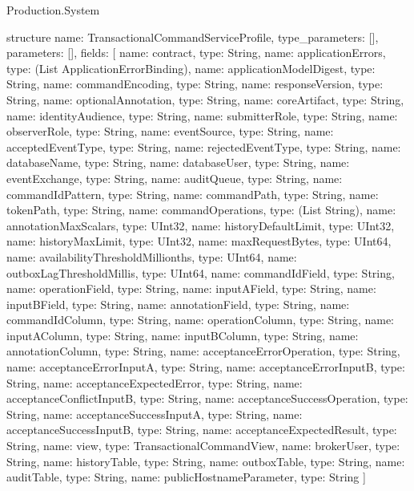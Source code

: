\begin{lexlean}{Production.System}
\begin{semanticmodule}
structure{
  name: TransactionalCommandServiceProfile,
  type_parameters: [],
  parameters: [],
  fields: [
    {name: contract, type: String},
    {name: applicationErrors, type: (List ApplicationErrorBinding)},
    {name: applicationModelDigest, type: String},
    {name: commandEncoding, type: String},
    {name: responseVersion, type: String},
    {name: optionalAnnotation, type: String},
    {name: coreArtifact, type: String},
    {name: identityAudience, type: String},
    {name: submitterRole, type: String},
    {name: observerRole, type: String},
    {name: eventSource, type: String},
    {name: acceptedEventType, type: String},
    {name: rejectedEventType, type: String},
    {name: databaseName, type: String},
    {name: databaseUser, type: String},
    {name: eventExchange, type: String},
    {name: auditQueue, type: String},
    {name: commandIdPattern, type: String},
    {name: commandPath, type: String},
    {name: tokenPath, type: String},
    {name: commandOperations, type: (List String)},
    {name: annotationMaxScalars, type: UInt32},
    {name: historyDefaultLimit, type: UInt32},
    {name: historyMaxLimit, type: UInt32},
    {name: maxRequestBytes, type: UInt64},
    {name: availabilityThresholdMillionths, type: UInt64},
    {name: outboxLagThresholdMillis, type: UInt64},
    {name: commandIdField, type: String},
    {name: operationField, type: String},
    {name: inputAField, type: String},
    {name: inputBField, type: String},
    {name: annotationField, type: String},
    {name: commandIdColumn, type: String},
    {name: operationColumn, type: String},
    {name: inputAColumn, type: String},
    {name: inputBColumn, type: String},
    {name: annotationColumn, type: String},
    {name: acceptanceErrorOperation, type: String},
    {name: acceptanceErrorInputA, type: String},
    {name: acceptanceErrorInputB, type: String},
    {name: acceptanceExpectedError, type: String},
    {name: acceptanceConflictInputB, type: String},
    {name: acceptanceSuccessOperation, type: String},
    {name: acceptanceSuccessInputA, type: String},
    {name: acceptanceSuccessInputB, type: String},
    {name: acceptanceExpectedResult, type: String},
    {name: view, type: TransactionalCommandView},
    {name: brokerUser, type: String},
    {name: historyTable, type: String},
    {name: outboxTable, type: String},
    {name: auditTable, type: String},
    {name: publicHostnameParameter, type: String}
  ]
}


\end{semanticmodule}
\end{lexlean}

